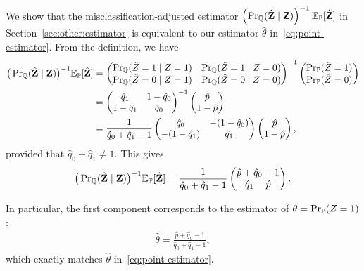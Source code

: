 We show that the misclassification-adjusted estimator $\left( \mathop{\rm Pr}\nolimits_{{\mathbb{Q}}}(\hat{{\mathbf{Z}}} \mid {\mathbf{Z}}) \right)^{-1} \displaystyle \mathbb{E}_{{\mathbb{P}}}[\hat{{\mathbf{Z}}}]$ in Section~\ref{sec:other:estimator}
is equivalent to our estimator $\hat{\theta}$ in~\eqref{eq:point-estimator}.
From the definition, we have
\begin{align}
    \big( \mathop{\rm Pr}\nolimits_{{\mathbb{Q}}}(\hat{{\mathbf{Z}}} \mid {\mathbf{Z}}) \big)^{-1} \displaystyle \mathbb{E}_{{\mathbb{P}}}[\hat{{\mathbf{Z}}}]
    &=
    \begin{pmatrix}
    \mathop{\rm Pr}\nolimits_{{\mathbb{Q}}}(\hat Z=1 \mid Z=1) & \mathop{\rm Pr}\nolimits_{{\mathbb{Q}}}(\hat Z=1 \mid Z=0) \\
    \mathop{\rm Pr}\nolimits_{{\mathbb{Q}}}(\hat Z=0 \mid Z=1) & \mathop{\rm Pr}\nolimits_{{\mathbb{Q}}}(\hat Z=0 \mid Z=0)
    \end{pmatrix}^{-1}
    \begin{pmatrix}
    \mathop{\rm Pr}\nolimits_{{\mathbb{P}}}(\hat Z=1) \\
    \mathop{\rm Pr}\nolimits_{{\mathbb{P}}}(\hat Z=0)
    \end{pmatrix} \\
    &=
    \begin{pmatrix}
     \hat{q}_1 & 1 - \hat{q}_0 \\
     1 - \hat{q}_1 & \hat{q}_0
    \end{pmatrix}^{-1}
    \begin{pmatrix}
    \hat{p} \\
    1 - \hat{p}
    \end{pmatrix} \\
    &=
    \frac{1}{\hat{q}_0 + \hat{q}_1 - 1}
    \begin{pmatrix}
        \hat{q}_0 & -(1 - \hat{q}_0) \\
        -(1 - \hat{q}_1) & \hat{q}_1
    \end{pmatrix}
    \begin{pmatrix}
    \hat{p} \\
    1 - \hat{p}
    \end{pmatrix},
\end{align}
provided that $\hat{q}_0 + \hat{q}_1 \neq 1$. This gives
\begin{align}
    \big( \mathop{\rm Pr}\nolimits_{{\mathbb{Q}}}(\hat{{\mathbf{Z}}} \mid {\mathbf{Z}}) \big)^{-1} \displaystyle \mathbb{E}_{{\mathbb{P}}}[\hat{{\mathbf{Z}}}]
    =
    \frac{1}{\hat{q}_0 + \hat{q}_1 - 1}
    \begin{pmatrix}
        \hat{p} + \hat{q}_0 - 1 \\
        \hat{q}_1 - \hat{p}
    \end{pmatrix}.
\end{align}

In particular, the first component corresponds to the estimator of
$\theta = \mathop{\rm Pr}\nolimits_{{\mathbb{P}}}(Z = 1)$:
\begin{align}
    \hat{\theta}
    =
    \frac{\hat{p} + \hat{q}_0 - 1}{\hat{q}_0 + \hat{q}_1 - 1},
\end{align}
which exactly matches $\hat{\theta}$ in~\eqref{eq:point-estimator}.



